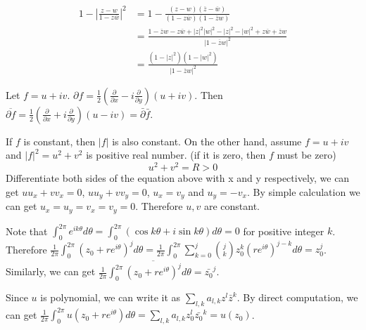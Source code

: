 \begin{problem}[1.1]
\begin{equation*}
	\begin{split}
		1- \left | \frac{z-w}{1-z\overline{w}} \right | ^2 & = 1 - \frac{\left( z-w \right)\left( \overline{z} - \overline{w} \right)}{\left( 1-z\overline{w} \right)\left( 1-\overline{z}w \right)} \\
		& = \frac{1-\overline{z}w -z\overline{w} + |z|^2|w|^2 -|z|^2 - |w|^2 + z\overline{w}+\overline{z}w}{|1-\overline{z}w|^2} \\
		& = \frac{\left( 1-|z|^2 \right)\left( 1-|w|^2 \right)}{|1-\overline{z}w|^2}
	\end{split}
	\label{<+label+>}
\end{equation*}
\end{problem}

\begin{problem}[1.2] \hfill

	Let $f = u+iv$. $\partial f = \frac{1}{2} \left( \frac{\partial}{\partial x} - i\frac{\partial}{\partial y} \right)\left( u+iv \right)$.
	Then $\overline{\partial f} = \frac{1}{2}\left( \frac{\partial}{\partial x} + i\frac{\partial}{\partial y} \right)\left( u-iv \right) = \bar{\partial} \bar{f}$.
\end{problem}

\begin{problem}[1.3] \hfill

	If $f$ is constant, then $|f|$ is also constant.
	On the other hand, assume $f = u+iv$ and $|f|^2 = u^2 + v^2$ is positive real number. (if it is zero, then $f$ must be zero)
	\begin{equation*}
		u^2 + v^2 = R >0
		\label{<+label+>}
	\end{equation*}
	Differentiate both sides of the equation above with x and y respectively, we can get $uu_x +vv_x = 0$, $uu_y + vv_y = 0$, $u_x = v_y$ and $u_y = -v_x$.
	By simple calculation we can get $u_x = u_y = v_x = v_y = 0$. Therefore $u, v$ are constant.
\end{problem}

\begin{problem}[1.4] \hfill

	Note that $\int_0^{2\pi}e^{ik\theta}d\theta = \int_{0}^{2\pi}\left( \cos k\theta + i\sin k\theta \right)d\theta = 0$ for positive integer $k$. 
	Therefore $\frac{1}{2\pi} \int_{0}^{2\pi}(z_0 + re^{i\theta})^j d\theta = \frac{1}{2\pi}\int_{0}^{2\pi}\sum_{k=0}^{j}{j \choose k}z_0^k\left( re^{i\theta} \right)^{j-k}d\theta = z_0^{j}$.
	Similarly, we can get $\frac{1}{2\pi}\int_{0}^{2\pi}\overline{\left( z_0 + re^{i\theta} \right)^j}d\theta = \bar{z_0}^j$.

	Since $u$ is polynomial, we can write it as $\sum_{l, k}a_{l, k}z^l \bar{z}^k$. By direct computation, we can get $\frac{1}{2\pi}\int_{0}^{2\pi} u\left( z_0 +re^{i\theta} \right)d\theta = \sum_{l, k}a_{l, k}z_0^{l}\bar{z_0}^{k} = u(z_0)$.
	
\end{problem}

